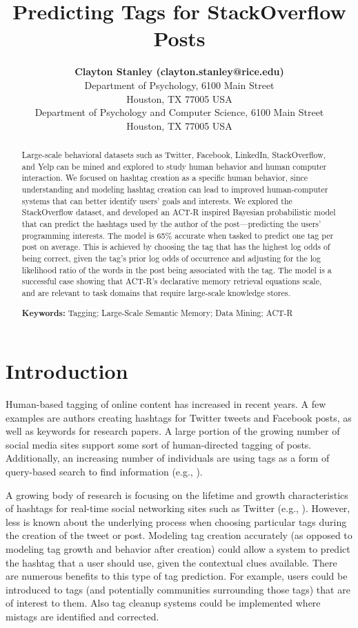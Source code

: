 \documentclass[10pt,letterpaper]{article}
\title{Predicting Tags for StackOverflow Posts}
\author{{\large \bf Clayton Stanley (clayton.stanley@rice.edu)} \\
  Department of Psychology, 6100 Main Street \\
  Houston, TX 77005 USA 
  \AND {\large \bf Michael D. Byrne (byrne@rice.edu)} \\
  Department of Psychology and Computer Science, 6100 Main Street \\
  Houston, TX 77005 USA }
\begin{document}
\maketitle

\frenchspacing

\begin{abstract}
  Large-scale behavioral datasets such as Twitter, Facebook, LinkedIn, StackOverflow, and Yelp can be mined and explored to study human behavior and human computer interaction.
  We focused on hashtag creation as a specific human behavior, since understanding and modeling hashtag creation can lead to improved human-computer systems that can better identify users' goals and interests.
  We explored the StackOverflow dataset, and developed an ACT-R inspired Bayesian probabilistic model that can predict the hashtags used by the author of the post---predicting the users' programming interests.
  The model is 65\% accurate when tasked to predict one tag per post on average.
  This is achieved by choosing the tag that has the highest log odds of being correct,
  given the tag's prior log odds of occurrence and adjusting for the log likelihood ratio of the words in the post being associated with the tag.
  The model is a successful case showing that ACT-R's declarative memory retrieval equations scale, and are relevant to task domains that require large-scale knowledge stores.

  \textbf{Keywords:}
  Tagging; Large-Scale Semantic Memory; Data Mining; ACT-R
\end{abstract}

\section{Introduction}

Human-based tagging of online content has increased in recent years.
A few examples are authors creating hashtags for Twitter tweets and Facebook posts, as well as keywords for research papers.
A large portion of the growing number of social media sites support some sort of human-directed tagging of posts.
Additionally, an increasing number of individuals are using tags as a form of query-based search to find information
(e.g., ).

A growing body of research is focusing on the lifetime and growth characteristics of hashtags for real-time social networking sites such as Twitter
(e.g., ).
However, less is known about the underlying process when choosing particular tags during the creation of the tweet or post.
Modeling tag creation accurately (as opposed to modeling tag growth and behavior after creation) could allow a system to predict the hashtag that a user should use, given the contextual clues available.
There are numerous benefits to this type of tag prediction.
For example, users could be introduced to tags (and potentially communities surrounding those tags) that are of interest to them.
Also tag cleanup systems could be implemented where mistags are identified and corrected.
\end{document}
